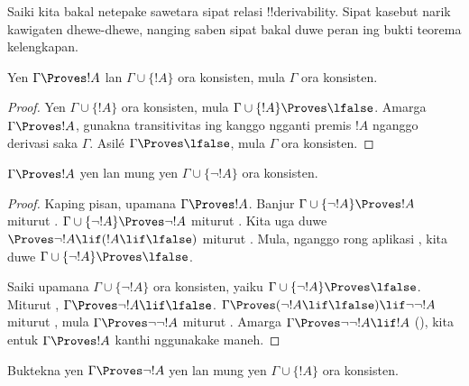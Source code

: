 \documentclass[../../../include/open-logic-section]{subfiles}
\begin{document}
      {}
      {}


Saiki kita bakal netepake sawetara sipat relasi !!{derivability}.
Sipat kasebut narik kawigaten dhewe-dhewe, nanging saben sipat bakal
duwe peran ing bukti teorema kelengkapan.

\begin{prop}
  Yen $\Gamma \Proves !A$ lan $\Gamma \cup \{!A\}$ ora konsisten,
  mula $\Gamma$ ora konsisten.
\end{prop}

\begin{proof}
  Yen $\Gamma \cup \{!A\}$ ora konsisten, mula $\Gamma \cup \{!A\}
  \Proves \lfalse$. Amarga $\Gamma \Proves !A$, gunakna transitivitas ing 
  kanggo ngganti premis $!A$ nganggo derivasi saka $\Gamma$. Asilé
  $\Gamma \Proves \lfalse$, mula $\Gamma$ ora konsisten.
\end{proof}

\begin{prop}
$\Gamma \Proves !A$ yen lan mung yen $\Gamma \cup \{\lnot !A\}$ ora
konsisten.
\end{prop}

\begin{proof}
Kaping pisan, upamana $\Gamma \Proves !A$. Banjur $\Gamma \cup \{\lnot
!A\} \Proves !A$ miturut . $\Gamma \cup
\{\lnot !A\} \Proves \lnot !A$ miturut
. Kita uga duwe $\Proves \lnot !A \lif
(!A \lif \lfalse)$ miturut . Mula, nganggo rong
aplikasi , kita duwe $\Gamma \cup \{\lnot !A\}
\Proves \lfalse$.

Saiki upamana $\Gamma \cup \{\lnot !A\}$ ora konsisten, yaiku $\Gamma
\cup \{\lnot !A\} \Proves \lfalse$. Miturut , $\Gamma
\Proves \lnot !A \lif \lfalse$. $\Gamma \Proves (\lnot !A \lif
\lfalse) \lif \lnot\lnot !A$ miturut , mula
$\Gamma \Proves \lnot\lnot !A$ miturut . Amarga
$\Gamma \Proves \lnot\lnot !A \lif !A$ (), kita
entuk $\Gamma \Proves !A$ kanthi nggunakake
 maneh.
\end{proof}

\begin{prob}
Buktekna yen $\Gamma \Proves \lnot !A$ yen lan mung yen $\Gamma \cup
\{!A\}$ ora konsisten.
\end{prob}
\end{document}
